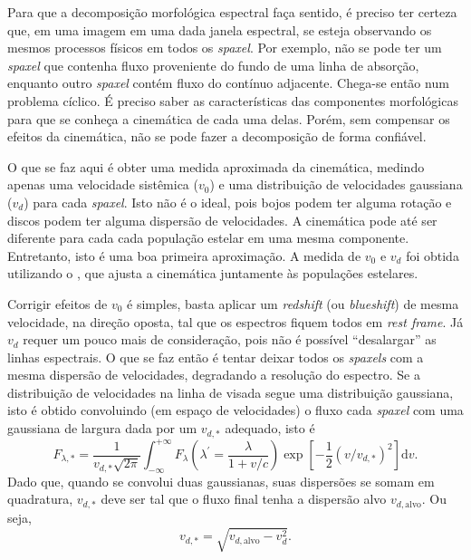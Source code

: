 Para que a decomposição morfológica espectral faça sentido, é preciso ter
certeza que, em uma imagem em uma dada janela espectral, se esteja observando os
mesmos processos físicos em todos os {\em spaxel}. Por exemplo, não se pode ter
um {\em spaxel} que contenha fluxo proveniente do fundo de uma linha de
absorção, enquanto outro {\em spaxel} contém fluxo do contínuo adjacente.
Chega-se então num problema cíclico. É preciso saber as características das
componentes morfológicas para que se conheça a cinemática de cada uma delas.
Porém, sem compensar os efeitos da cinemática, não se pode fazer a decomposição
de forma confiável.

O que se faz aqui é obter uma medida aproximada da cinemática, medindo apenas
uma velocidade sistêmica ($v_0$) e uma distribuição de velocidades gaussiana
($v_d$) para cada {\em spaxel}. Isto não é o ideal, pois bojos podem ter alguma
rotação e discos podem ter alguma dispersão de velocidades. A cinemática pode
até ser diferente para cada cada população estelar em uma mesma componente.
Entretanto, isto é uma boa primeira aproximação. A medida de $v_0$ e $v_d$ foi
obtida utilizando o \starlight, que ajusta a cinemática juntamente às populações
estelares.

Corrigir efeitos de $v_0$ é simples, basta aplicar um {\em redshift} (ou {\em
blueshift}) de mesma velocidade, na direção oposta, tal que os espectros fiquem
todos em {\em rest frame}. Já $v_d$ requer um pouco mais de consideração, pois
não é possível ``desalargar'' as linhas espectrais. O que se faz então é tentar
deixar todos os {\em spaxels} com a mesma dispersão de velocidades, degradando a
resolução do espectro. Se a distribuição de velocidades na linha de visada segue
uma distribuição gaussiana, isto é obtido convoluindo (em espaço de velocidades)
o fluxo cada {\em spaxel} com uma gaussiana de largura dada por um $v_{d,\ast}$
adequado, isto é
\begin{equation*}
F_{\lambda,\ast} = \frac{1}{v_{d,\ast}\sqrt{2\pi}}\int_{-\infty}^{+\infty}
F_\lambda \left(\lambda^\prime = \frac{\lambda}{1 + v/c}\right) \exp \left[ -\frac{1}{2}
(v/v_{d,\ast})^2 \right] \mathrm{d}v.
\end{equation*}
Dado que, quando se convolui duas gaussianas, suas dispersões se somam em
quadratura, $v_{d,\ast}$ deve ser tal que o fluxo final tenha a dispersão
alvo $v_{d,\mathrm{alvo}}$. Ou seja,
\begin{equation*}
v_{d,\ast} = \sqrt{v_{d,\mathrm{alvo}} - v^2_d}.
\end{equation*}

